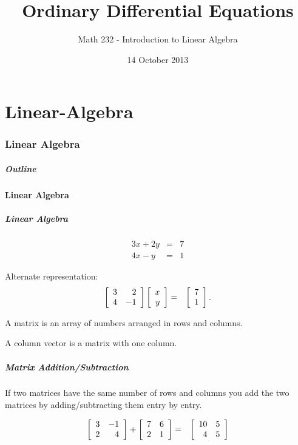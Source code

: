 \part{Linear-Algebra}
\section{Linear Algebra}

\title{Ordinary Differential Equations}
\subtitle{Math 232 - Introduction to Linear Algebra}
\date{14 October 2013}

\begin{frame}
  \titlepage
\end{frame}

\begin{frame}
  \frametitle{Outline}
  \tableofcontents[ currentsection ]
\end{frame}


\subsection{Linear Algebra}


\begin{frame}
  \frametitle{Linear Algebra}


  \begin{eqnarray*}
    3x + 2y & = & 7 \\
    4x - y & = & 1
  \end{eqnarray*}

  {
    Alternate representation:
    \begin{eqnarray*}
      \left[ \begin{array}{rr} 3 & 2 \\ 4 & -1 \end{array} \right] \left[ \begin{array}{r} x \\ y \end{array} \right] & = & \left[ \begin{array}{r} 7 \\ 1 \end{array} \right].
    \end{eqnarray*}

    A matrix is an array of numbers arranged in rows and columns.

    A column vector is a matrix with one column.

  }


\end{frame}


\begin{frame}
  \frametitle{Matrix Addition/Subtraction}

  If two matrices have the same number of rows and columns you add the
  two matrices by adding/subtracting them entry by entry.

  \begin{eqnarray*}
    \left[ \begin{array}{rr} 3 & -1 \\ 2 & 4 \end{array} \right] + \left[ \begin{array}{rr} 7 & 6 \\ 2 & 1 \end{array} \right] & = & \left[ \begin{array}{rr} 10 & 5 \\ 4 & 5 \end{array} \right]
  \end{eqnarray*}

\end{frame}


